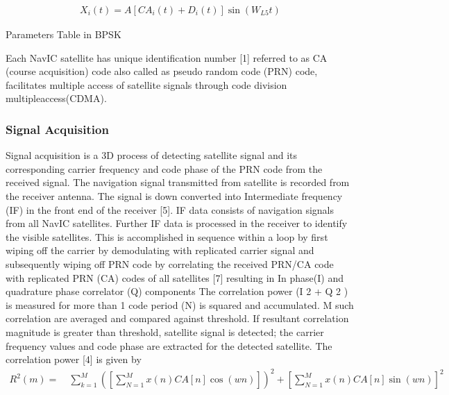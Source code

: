 \documentclass[onecolumn]{article}
\providecommand{\brak}[1]{\ensuremath{\left(#1\right)}}
\providecommand{\sbrak}[1]{\ensuremath{{}\left[#1\right]}}
\begin{document}
\begin{enumerate}
\begin{Large}
\begin{align}
X_i(t)= A\sbrak{ CA_i(t) + D_i(t)}\sin \brak{ W_{L5} t }
\end{align}
\end{Large}
\begin{table}[h]
\centering
	\caption{\Large{Parameters Table in BPSK}}
	
\end{table}
\begin{Large}

Each NavIC satellite has unique identification number [1] referred to as CA (course acquisition) code also called as pseudo random code (PRN) code, facilitates multiple access of satellite signals through code division multipleaccess(CDMA).\\

\subsubsection{Signal Acquisition}

Signal acquisition is a 3D process of detecting satellite signal and its corresponding carrier frequency and code phase of the PRN code from the received signal. The navigation signal transmitted from satellite is recorded from the receiver antenna. The signal is down converted into Intermediate frequency (IF) in the front end of the receiver [5]. IF data consists of navigation signals from all NavIC satellites.
Further IF data is processed in the receiver to identify the visible satellites. This is accomplished in sequence within a loop by first wiping off the carrier by demodulating with replicated carrier signal and subsequently wiping off PRN code by correlating the received PRN/CA code with replicated PRN (CA) codes of all satellites [7] resulting in In phase(I) and quadrature phase correlator (Q) components
The correlation power (I 2 + Q 2 ) is measured for more than 1 code period (N) is squared and accumulated. M such correlation are averaged and compared against threshold. If resultant correlation magnitude is greater than threshold, satellite signal is detected; the carrier frequency values and
code phase are extracted for the detected satellite. The correlation power [4] is given by
\begin{align}
R^2(m)=\quad\sum_{k=1}^M\brak{\sbrak{\sum_{N=1}^M x\brak{n}CA\sbrak{n}\cos\brak{wn}}}^2 + \sbrak{\sum_{N=1}^M x(n)CA\sbrak{n}\sin\brak{wn}}^2
\end{align}


\end{Large}
\end{enumerate}
\end{document}
